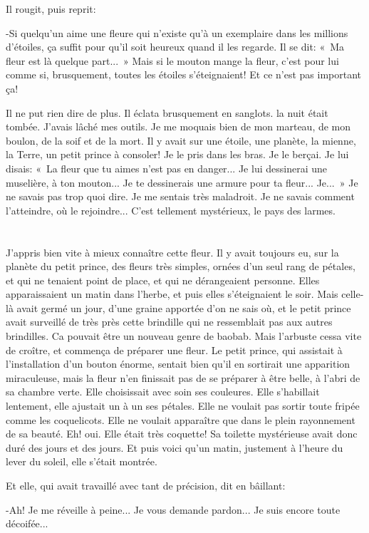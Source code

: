 \documentclass{report}
\newcommand{\parachapter}[2][]{\end{paracol}\chapter[#1]{#2}\begin{paracol}{2}}
\begin{document}
\begin{paracol}{2}
Il rougit, puis reprit:

-Si quelqu'un aime une fleure qui n'existe qu'à un exemplaire dans les millions d'étoiles, ça suffit pour qu'il soit heureux quand il les regarde. Il se dit: «~Ma fleur est là quelque part...~» Mais si le mouton mange la fleur, c'est pour lui comme si, brusquement, toutes les étoiles s'éteignaient! Et ce n'est pas important ça!

Il ne put rien dire de plus. Il éclata brusquement en sanglots. la nuit était tombée. J'avais lâché mes outils. Je me moquais bien de mon marteau, de mon boulon, de la soif et de la mort. Il y avait sur une étoile, une planète, la mienne, la Terre, un petit prince à consoler! Je le pris dans les bras. Je le berçai. Je lui disais: «~La fleur que tu aimes n'est pas en danger... Je lui dessinerai une muselière, à ton mouton... Je te dessinerais une armure pour ta fleur... Je...~» Je ne savais pas trop quoi dire. Je me sentais très maladroit. Je ne savais comment l'atteindre, où le rejoindre... C'est tellement mystérieux, le pays des larmes.

\parachapter[VIII]{} %
J'appris bien vite à mieux connaître cette fleur. Il y avait toujours eu, sur la planète du petit prince, des fleurs très simples, ornées d'un seul rang de pétales, et qui ne tenaient point de place, et qui ne dérangeaient personne. Elles apparaissaient un matin dans l'herbe, et puis elles s'éteignaient le soir. Mais celle-là avait germé un jour, d'une graine apportée d'on ne sais où, et le petit prince avait surveillé de très près cette brindille qui ne ressemblait pas aux autres brindilles. Ca pouvait être un nouveau genre de baobab. Mais l'arbuste cessa vite de croître, et commença de préparer une fleur. Le petit prince, qui assistait à l'installation d'un bouton énorme, sentait bien qu'il en sortirait une apparition miraculeuse, mais la fleur n'en finissait pas de se préparer à être belle, à l'abri de sa chambre verte. Elle choisissait avec soin ses couleures. Elle s'habillait lentement, elle ajustait un à un ses pétales. Elle ne voulait pas sortir toute fripée comme les coquelicots. Elle ne voulait apparaître que dans le plein rayonnement de sa beauté. Eh! oui. Elle était très coquette! Sa toilette mystérieuse avait donc duré des jours et des jours. Et puis voici qu'un matin, justement à l'heure du lever du soleil, elle s'était montrée.

Et elle, qui avait travaillé avec tant de précision, dit en bâillant:

-Ah! Je me réveille à peine... Je vous demande pardon... Je suis encore toute décoifée...


\end{paracol}
\end{document}
